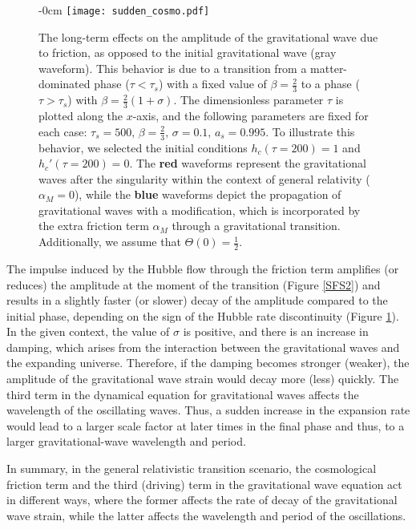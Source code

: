 \documentclass[universe,article,accept,moreauthors,pdftex]{Definitions/mdpi}
\begin{document}
\begin{figure}[H] 
 
\begin{adjustwidth}{-\extralength}{0cm}
   \centering
    \texttt{[image: sudden\_cosmo.pdf]}
\end{adjustwidth}
     \caption{ The long-term effects on the amplitude of the gravitational wave due to friction, as opposed to the initial gravitational wave (gray waveform). This behavior is due to a transition from a matter-dominated phase ($\tau<\tau_{s}$) with a fixed value of $\beta=\frac{2}{3}$ to a phase ($\tau>\tau_{s}$) with $\beta=\frac{2}{3}(1+\sigma)$. The dimensionless parameter $\tau$ is plotted along the $x$-axis, and the following parameters are fixed for each case: $\tau_{s}=500,\,\beta=\frac{2}{3},\,\sigma=0.1,\, a_{s}=0.995$. To illustrate this behavior, we selected the initial conditions $h_{c}(\tau=200)=1$ and $h_{c}'(\tau=200)=0$. The \textbf{red} waveforms represent the gravitational waves after the singularity within the context of general relativity ($\alpha_{M}=0$), while the \textbf{blue} waveforms depict the propagation of gravitational waves with a modification, which is incorporated by the extra friction term $\alpha_{M}$ through a gravitational transition. Additionally, we assume that $\Theta(0) = \frac{1}{2}$. }
    \label{SFS3}
\end{figure}

The impulse induced by the Hubble flow through the friction term amplifies (or reduces) the amplitude at the moment of the transition (Figure \ref{SFS2}) and results in a slightly faster (or slower) decay of the amplitude compared to the initial phase, depending on the sign of the Hubble rate discontinuity (Figure \ref{SFS3}). In the given context, the value of $\sigma$ is positive, and there is an increase in damping, which arises from the interaction between the gravitational waves and the expanding universe. Therefore, if the damping becomes stronger (weaker), the amplitude of the gravitational wave strain would decay more (less) quickly. The third term in the dynamical equation for gravitational waves affects the wavelength of the oscillating waves. Thus, a sudden increase in the expansion rate would lead to a larger scale factor at later times in the final phase and thus, to a larger gravitational-wave wavelength and period.

In summary, in the general relativistic transition scenario, the cosmological friction term and the third (driving) term in the gravitational wave equation act in different ways, where the former affects the rate of decay of the gravitational wave strain, while the latter affects the wavelength and period of the oscillations. 
\end{document}
